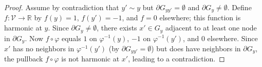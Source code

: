 \documentclass[10pt,a4paper]{amsart}
\begin{document}
\begin{proof}
Assume by contradiction that $y' \sim y$ but $\partial G_{yy'} = \emptyset$ and $\partial G_y \neq \emptyset$. Define $f: \mathcal{V} \to \mathbb{R}$ by $f(y) = 1$, $f(y') = -1$, and $f = 0$ elsewhere; this function is harmonic at $y$. Since $\partial G_y \neq \emptyset$, there exists $x' \in G_y$ adjacent to at least one node in $\partial G_y$. Now $f \circ \varphi$ equals $1$ on $\varphi^{-1}(y)$, $-1$ on $\varphi^{-1}(y')$, and $0$ elsewhere. Since $x'$ has no neighbors in $\varphi^{-1}(y')$ (by $\partial G_{yy'} = \emptyset$) but does have neighbors in $\partial G_y$, the pullback $f \circ \varphi$ is not harmonic at $x'$, leading to a contradiction.
\end{proof}
\end{document}
